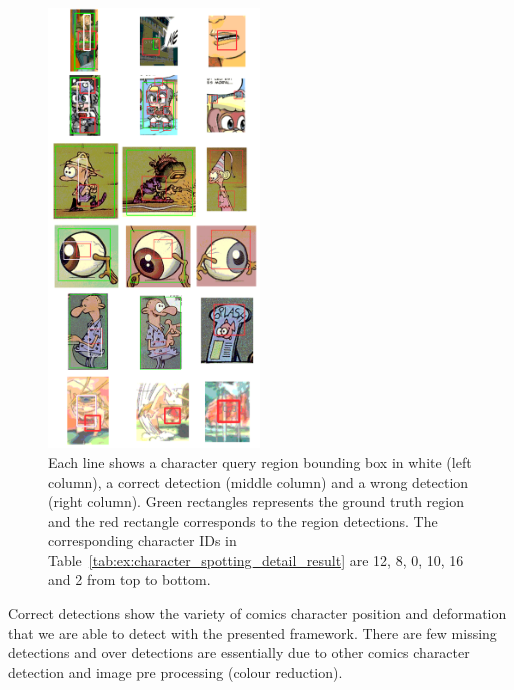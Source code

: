  \begin{figure}[!h]  %
   \centering
  \includegraphics[width=0.5\textwidth]{result_exemples.png}
  \caption[Character spotting result sample]{
  Each line shows a character query region bounding box in white (left column), a correct detection (middle column) and a wrong detection (right column). Green rectangles represents the ground truth region and the red rectangle corresponds to the region detections. The corresponding character IDs in Table~\ref{tab:ex:character_spotting_detail_result} are 12, 8, 0, 10, 16 and 2 from top to bottom. %
  }
  \label{fig:ex:character_spotting_results}
 \end{figure}

Correct detections show the variety of comics character position and deformation that we are able to detect with the presented framework. There are few missing detections and over detections are essentially due to other comics character detection and image pre processing (colour reduction).

